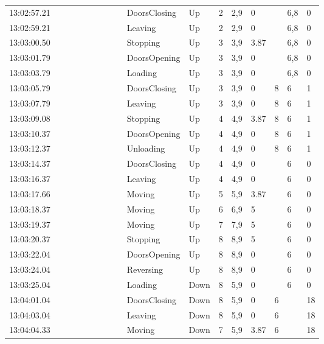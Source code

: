 \documentclass{UoYCSproject}
\begin{document}
\begin{appendices}
\begin{landscape}
\begin{longtable}{l || l | l | l | l | l | l | l | l || l | l | l | l | l | l | l | l}
	13:02:57.21 &  &  &  &  &  &  &  &  & DoorsClosing & Up & 2 & 2,9 & 0 &  & 6,8 & 0 \\
	13:02:59.21 &  &  &  &  &  &  &  &  & Leaving & Up & 2 & 2,9 & 0 &  & 6,8 & 0 \\
	13:03:00.50 &  &  &  &  &  &  &  &  & Stopping & Up & 3 & 3,9 & 3.87 &  & 6,8 & 0 \\
	13:03:01.79 &  &  &  &  &  &  &  &  & DoorsOpening & Up & 3 & 3,9 & 0 &  & 6,8 & 0 \\
	13:03:03.79 &  &  &  &  &  &  &  &  & Loading & Up & 3 & 3,9 & 0 &  & 6,8 & 0 \\
	13:03:05.79 &  &  &  &  &  &  &  &  & DoorsClosing & Up & 3 & 3,9 & 0 & 8 & 6 & 1 \\
	13:03:07.79 &  &  &  &  &  &  &  &  & Leaving & Up & 3 & 3,9 & 0 & 8 & 6 & 1 \\
	13:03:09.08 &  &  &  &  &  &  &  &  & Stopping & Up & 4 & 4,9 & 3.87 & 8 & 6 & 1 \\
	13:03:10.37 &  &  &  &  &  &  &  &  & DoorsOpening & Up & 4 & 4,9 & 0 & 8 & 6 & 1 \\
	13:03:12.37 &  &  &  &  &  &  &  &  & Unloading & Up & 4 & 4,9 & 0 & 8 & 6 & 1 \\
	13:03:14.37 &  &  &  &  &  &  &  &  & DoorsClosing & Up & 4 & 4,9 & 0 &  & 6 & 0 \\
	13:03:16.37 &  &  &  &  &  &  &  &  & Leaving & Up & 4 & 4,9 & 0 &  & 6 & 0 \\
	13:03:17.66 &  &  &  &  &  &  &  &  & Moving & Up & 5 & 5,9 & 3.87 &  & 6 & 0 \\
	13:03:18.37 &  &  &  &  &  &  &  &  & Moving & Up & 6 & 6,9 & 5 &  & 6 & 0 \\
	13:03:19.37 &  &  &  &  &  &  &  &  & Moving & Up & 7 & 7,9 & 5 &  & 6 & 0 \\
	13:03:20.37 &  &  &  &  &  &  &  &  & Stopping & Up & 8 & 8,9 & 5 &  & 6 & 0 \\
	13:03:22.04 &  &  &  &  &  &  &  &  & DoorsOpening & Up & 8 & 8,9 & 0 &  & 6 & 0 \\
	13:03:24.04 &  &  &  &  &  &  &  &  & Reversing & Up & 8 & 8,9 & 0 &  & 6 & 0 \\
	13:03:25.04 &  &  &  &  &  &  &  &  & Loading & Down & 8 & 5,9 & 0 &  & 6 & 0 \\
	13:04:01.04 &  &  &  &  &  &  &  &  & DoorsClosing & Down & 8 & 5,9 & 0 & 6 &  & 18 \\
	13:04:03.04 &  &  &  &  &  &  &  &  & Leaving & Down & 8 & 5,9 & 0 & 6 &  & 18 \\
	13:04:04.33 &  &  &  &  &  &  &  &  & Moving & Down & 7 & 5,9 & 3.87 & 6 &  & 18 \\

\end{longtable}
\end{landscape}
\end{appendices}
\end{document}
